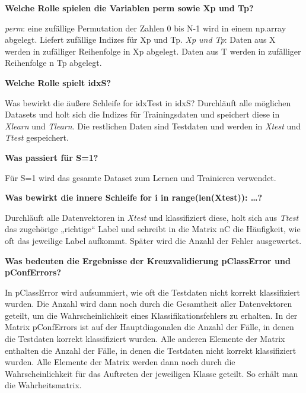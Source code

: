 \vspace{5px}
\noindent
\textbf{Welche Rolle spielen die Variablen perm sowie Xp und Tp?}

\vspace{5px}
\noindent
\textit{perm}: eine zufällige Permutation der Zahlen 0 bis N-1 wird in einem np.array abgelegt. Liefert zufällige Indizes für Xp und Tp.
\textit{Xp und Tp}: Daten aus X werden in zufälliger Reihenfolge in Xp abgelegt. Daten aus T werden in zufälliger Reihenfolge n Tp abgelegt.

\vspace{5px}
\noindent
\textbf{Welche Rolle spielt idxS?}

\vspace{5px}
\noindent
Was bewirkt die äußere Schleife for idxTest in idxS?
Durchläuft alle möglichen Datasets und holt sich die Indizes für Trainingsdaten und speichert diese in \textit{X\textunderscore learn} und \textit{T\textunderscore learn}. Die restlichen Daten sind Testdaten und werden in \textit{X\textunderscore test} und \textit{T\textunderscore test} gespeichert. 

\vspace{5px}
\noindent
\textbf{Was passiert für S=1?}

\vspace{5px}
\noindent
Für S=1 wird das gesamte Dataset zum Lernen und Trainieren verwendet.

\vspace{5px}
\noindent
\textbf{Was bewirkt die innere Schleife for i in range(len(X\textunderscore test)): …?}

\vspace{5px}
\noindent
Durchläuft alle Datenvektoren in \textit{X\textunderscore test} und klassifiziert diese, holt sich aus \textit{T\textunderscore test} das zugehörige „richtige“ Label und schreibt in die Matrix nC die Häufigkeit, wie oft das jeweilige Label aufkommt. Später wird die Anzahl der Fehler ausgewertet. 

\vspace{5px}
\noindent
\textbf{Was bedeuten die Ergebnisse der Kreuzvalidierung pClassError und pConfErrors?}

\vspace{5px}
\noindent
In pClassError wird aufsummiert, wie oft die Testdaten nicht korrekt klassifiziert wurden. Die Anzahl wird dann noch durch die Gesamtheit aller Datenvektoren geteilt, um die Wahrscheinlichkeit eines Klassifikationsfehlers zu erhalten.
In der Matrix pConfErrors ist auf der Hauptdiagonalen die Anzahl der Fälle, in denen die Testdaten korrekt klassifiziert wurden. Alle anderen Elemente der Matrix enthalten die Anzahl der Fälle, in denen die Testdaten nicht korrekt klassifiziert wurden. Alle Elemente der Matrix werden dann noch durch die Wahrscheinlichkeit für das Auftreten der jeweiligen Klasse geteilt. So erhält man die Wahrheitsmatrix. 

